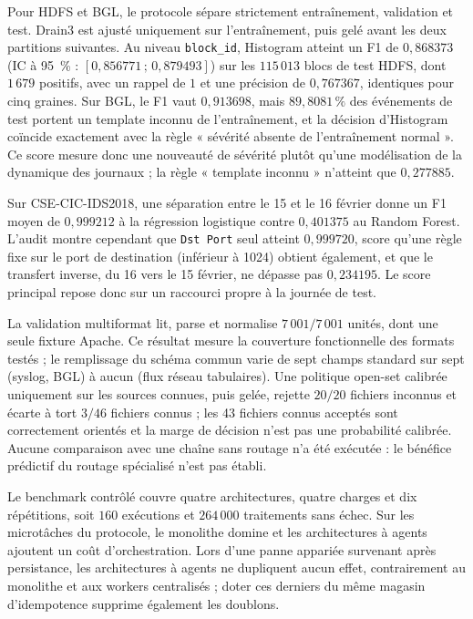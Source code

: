 Pour HDFS et BGL, le protocole sépare strictement entraînement, validation et
test. Drain3 est ajusté uniquement sur l'entraînement, puis gelé avant les
deux partitions suivantes. Au niveau \texttt{block\_id}, Histogram atteint un
F1 de $0{,}868373$ (IC à 95~\% : $[0{,}856771\,;\,0{,}879493]$) sur les
$115\,013$ blocs de test HDFS, dont $1\,679$ positifs, avec un rappel de $1$
et une précision de $0{,}767367$, identiques pour cinq graines. Sur BGL, le F1
vaut $0{,}913698$, mais $89{,}8081\,\%$ des événements de test portent un
template inconnu de l'entraînement, et la décision d'Histogram coïncide
exactement avec la règle « sévérité absente de l'entraînement normal ». Ce
score mesure donc une nouveauté de sévérité plutôt qu'une modélisation de la
dynamique des journaux ; la règle « template inconnu » n'atteint que
$0{,}277885$.

Sur CSE-CIC-IDS2018, une séparation entre le 15 et le 16 février donne un F1
moyen de $0{,}999212$ à la régression logistique contre $0{,}401375$ au
Random Forest. L'audit montre cependant que \texttt{Dst Port} seul atteint
$0{,}999720$, score qu'une règle fixe sur le port de destination (inférieur à
1024) obtient également, et que le transfert inverse, du 16 vers le
15 février, ne dépasse pas $0{,}234195$. Le score principal repose donc sur
un raccourci propre à la journée de test.

La validation multiformat lit, parse et normalise $7\,001/7\,001$ unités, dont
une seule fixture Apache. Ce résultat mesure la couverture fonctionnelle des
formats testés ; le remplissage du schéma commun varie de sept champs standard
sur sept (syslog, BGL) à aucun (flux réseau tabulaires). Une politique
open-set calibrée uniquement sur les sources connues, puis gelée, rejette
$20/20$ fichiers inconnus et écarte à tort $3/46$ fichiers connus ; les
43 fichiers connus acceptés sont correctement orientés et la marge de décision
n'est pas une probabilité calibrée. Aucune comparaison avec une chaîne sans
routage n'a été exécutée : le bénéfice prédictif du routage spécialisé n'est
pas établi.

Le benchmark contrôlé couvre quatre architectures, quatre charges et dix
répétitions, soit $160$ exécutions et $264\,000$ traitements sans échec. Sur
les microtâches du protocole, le monolithe domine et les architectures à
agents ajoutent un coût d'orchestration. Lors d'une panne appariée survenant
après persistance, les architectures à agents ne dupliquent aucun effet,
contrairement au monolithe et aux workers centralisés ; doter ces derniers du
même magasin d'idempotence supprime également les doublons.

